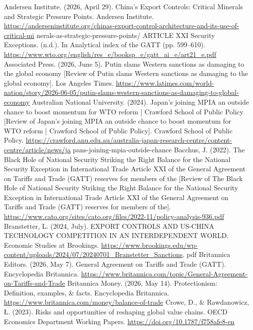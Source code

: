 
\begin{referencelist}
   Andersen Institute. (2026, April 29). China’s Export Controls: Critical Minerals and Strategic Pressure Points. Andersen Institute. \url{https://anderseninstitute.org/chinas-export-control-architecture-and-its-use-of-critical-mi} nerals-as-strategic-pressure-points/
   ARTICLE XXI Security Exceptions. (n.d.). In Analytical index of the GATT (pp. 599–610). \url{https://www.wto.org/english/res_e/booksp_e/gatt_ai_e/art21_e.pdf}
   Associated Press. (2026, June 5). Putin slams Western sanctions as damaging to the global economy [Review of Putin slams Western sanctions as damaging to the global economy]. Los Angeles Times. \url{https://www.latimes.com/world-nation/story/2026-06-05/putin-slams-western-sanctions-as-damaging-to-global-economy}
   Australian National University. (2024). Japan’s joining MPIA an outside chance to boost momentum for WTO reform | Crawford School of Public Policy [Review of Japan’s joining MPIA an outside chance to boost momentum for WTO reform | Crawford School of Public Policy]. Crawford School of Public Policy. \url{https://crawford.anu.edu.au/australia-japan-research-centre/content-centre/article/news/ja} pans-joining-mpia-outside-chance
   Bacchus, J. (2022). The Black Hole of National Security Striking the Right Balance for the National Security Exception in International Trade Article XXI of the General Agreement on Tariffs and Trade (GATT) reserves for members of the [Review of The Black Hole of National Security Striking the Right Balance for the National Security Exception in International Trade Article XXI of the General Agreement on Tariffs and Trade (GATT) reserves for members of the]. \url{https://www.cato.org/sites/cato.org/files/2022-11/policy-analysis-936.pdf}
   Branstetter, L. (2024, July). EXPORT CONTROLS AND US-CHINA TECHNOLOGY COMPETITION IN AN INTERDEPENDENT WORLD. Economic Studies at Brookings. \url{https://www.brookings.edu/wp-content/uploads/2024/07/20240701_Branstetter_Sanctions}. pdf
   Britannica Editors. (2026, May 7). General Agreement on Tariffs and Trade (GATT). Encyclopedia Britannica. \url{https://www.britannica.com/topic/General-Agreement-on-Tariffs-and-Trade}
   Britannica Money. (2026, May 14). Protectionism: Definition, examples, \& facts. Encyclopedia Britannica. \url{https://www.britannica.com/money/balance-of-trade}
   Crowe, D., \& Rawdanowicz, Ł. (2023). Risks and opportunities of reshaping global value chains. OECD Economics Department Working Papers. \url{https://doi.org/10.1787/f758afe8-en}

\end{referencelist}
